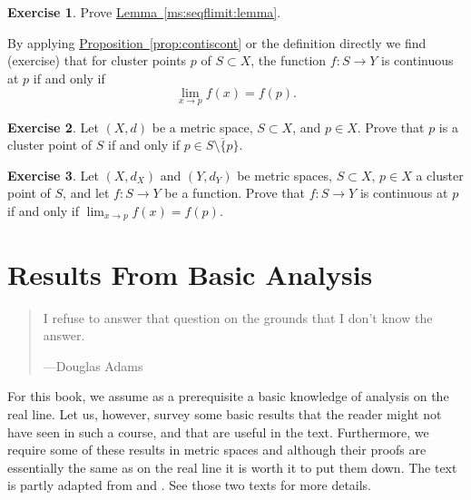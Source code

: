 \documentclass[12pt,openany]{book}
\theoremstyle{plain}
\theoremstyle{remark}
\theoremstyle{definition}
\newenvironment{exbox}{%
    \def\FrameCommand{\vrule width 1pt \relax\hspace{10pt}}%
    \MakeFramed{\advance\hsize-\width\FrameRestore}%
}{%
    \endMakeFramed
}
\newenvironment{myepigraph}{%
    \begin{quote}%
    \begingroup\itshape
}{%
    \endgroup%
    \end{quote}
}
\theoremstyle{exercise}
\newtheorem{exercise}{Exercise}[section]
\theoremstyle{example}
\newcommand{\propref}[1]{\hyperref[#1]{Proposition~\ref*{#1}}}
\newcommand{\lemmaref}[1]{\hyperref[#1]{Lemma~\ref*{#1}}}
\begin{document}
\begin{exbox}
\begin{exercise}
Prove \lemmaref{ms:seqflimit:lemma}.
\end{exercise}
\end{exbox}

By applying \propref{prop:contiscont} or the definition directly we find
(exercise) that for cluster points $p$ of $S
\subset X$, the function
$f \colon S \to Y$ is continuous at $p$ if and only if
\begin{equation*}
\lim_{x \to p} f(x) = f(p) .
\end{equation*}

\begin{exbox}
\begin{exercise}
Let $(X,d)$ be a metric space, $S \subset X$, and $p \in X$.  Prove that
$p$ is a cluster point of $S$ if and only if $p \in \overline{S \setminus \{
p \}}$.
\end{exercise}

\begin{exercise}
Let $(X,d_X)$ and $(Y,d_Y)$ be metric spaces, $S \subset X$, $p \in X$
a cluster point of $S$, and let $f \colon S \to Y$ be a function.
Prove that
$f \colon S \to Y$ is continuous at $p$ if and only if
$\lim_{x \to p} f(x) = f(p)$.
\end{exercise}
\end{exbox}


\chapter{Results From Basic Analysis} \label{ap:basicanal}

\begin{myepigraph}
I refuse to answer that question on the grounds that I don't know the
answer.

---Douglas Adams
\end{myepigraph}

For this book,
we assume as a prerequisite a basic knowledge of analysis on the real line.
Let us, however, survey some basic results that the reader might not have
seen in such a course, and that are useful in the text.  Furthermore,
we require some of these results in metric spaces and although their proofs
are essentially the same as on the real line it is worth it to put them down.
The text is partly adapted from \cite{ra:book} and \cite{ra:book2}.
See those two texts for more details.
\end{document}

